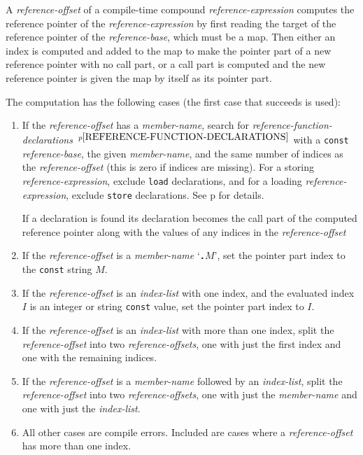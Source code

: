 \documentclass[12pt]{article}
\newcommand{\TT}[1]{{\tt \bfseries #1}}
\newcommand{\pagref}[1]{p\pageref{#1}}
\newcommand{\pagnote}[1]{$\,^{p\pageref{#1}}$}
\begin{document}
A {\em reference-offset} of a compile-time compound {\em reference-expression}
computes the reference pointer of the {\em reference-expression}
by first reading the target of the reference pointer of the
{\em reference-base}, which must be a map.  Then either an index is
computed and added to the map to make the pointer part
of a new reference pointer with no call part, or a call part is computed
and the new reference pointer is given the map by itself as its pointer part.

The computation has the following cases (the first case that
succeeds is used):\label{COMPILE-TIME-FIELD-SELECTION}
\begin{enumerate}
\item If the {\em reference-offset} has a {\em member-name},
search for {\em reference-function-declarations}%
\pagnote{REFERENCE-FUNCTION-DECLARATIONS} with a {\tt const}
{\em reference-base}, the given {\em member-name}, and the same number
of indices as the {\em reference-offset} (this is zero if indices
are missing).
For a storing
{\em reference-expression}, exclude {\tt load} declarations, and
for a loading {\em reference-expression}, exclude {\tt store}
declarations.  See
\pagref{REFERENCE-CALL-REFERENCE-DECLARATION-OFFSET-MATCHING} for details.

If a declaration is found its declaration becomes the call part of the
computed reference pointer along with the values of any indices
in the {\em reference-offset}

\item If the {\em reference-offset} is a {\em member-name} `\TT{.}$M$',
set the pointer part index to the {\tt const} string $M$.
\item If the {\em reference-offset} is an {\em index-list} with one
index, and the evaluated index $I$ is an integer or string {\tt const} value,
set the pointer part index to $I$.
\item If the {\em reference-offset} is an {\em index-list} with more than
one index, split the {\em reference-offset} into two
{\em reference-offsets}, one with just the first index and one with
the remaining indices.
\item If the {\em reference-offset} is a {\em member-name} followed
by an {\em index-list}, split the {\em reference-offset} into two
{\em reference-offsets}, one with just the {\em member-name} and one with
just the {\em index-list}.
\item All other cases are compile errors.
Included are cases where a {\em reference-offset} has more than one index.
\end{enumerate}
\end{document}
